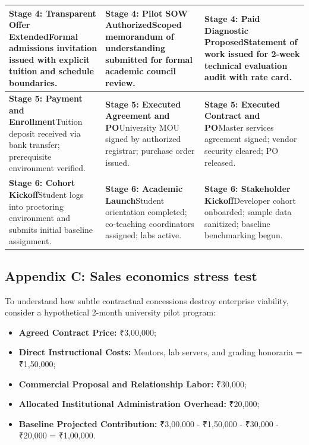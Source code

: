 \begin{table}[t]
\begin{tabular}{p{4.8cm}p{5.2cm}p{5.2cm}}
\hline
\textbf{Stage 4: Transparent Offer Extended}\newline Formal admissions invitation issued with explicit tuition and schedule boundaries. & \textbf{Stage 4: Pilot SOW Authorized}\newline Scoped memorandum of understanding submitted for formal academic council review. & \textbf{Stage 4: Paid Diagnostic Proposed}\newline Statement of work issued for 2-week technical evaluation audit with rate card. \\
\hline
\textbf{Stage 5: Payment and Enrollment}\newline Tuition deposit received via bank transfer; prerequisite environment verified. & \textbf{Stage 5: Executed Agreement and PO}\newline University MOU signed by authorized registrar; purchase order issued. & \textbf{Stage 5: Executed Contract and PO}\newline Master services agreement signed; vendor security cleared; PO released. \\
\hline
\textbf{Stage 6: Cohort Kickoff}\newline Student logs into proctoring environment and submits initial baseline assignment. & \textbf{Stage 6: Academic Launch}\newline Student orientation completed; co-teaching coordinators assigned; labs active. & \textbf{Stage 6: Stakeholder Kickoff}\newline Developer cohort onboarded; sample data sanitized; baseline benchmarking begun. \\
\hline
\end{tabular}
\end{table}

\subsection*{Appendix C: Sales economics stress test}

To understand how subtle contractual concessions destroy enterprise viability, consider a hypothetical 2-month university pilot program:
\begin{itemize}
\item \textbf{Agreed Contract Price:} ₹3,00,000;
\item \textbf{Direct Instructional Costs:} Mentors, lab servers, and grading honoraria = ₹1,50,000;
\item \textbf{Commercial Proposal and Relationship Labor:} ₹30,000;
\item \textbf{Allocated Institutional Administration Overhead:} ₹20,000;
\item \textbf{Baseline Projected Contribution:} ₹3,00,000 - ₹1,50,000 - ₹30,000 - ₹20,000 = ₹1,00,000.
\end{itemize}

